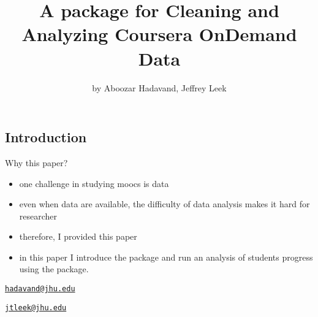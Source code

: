 \title{A package for Cleaning and Analyzing Coursera OnDemand Data}
\author{by Aboozar Hadavand, Jeffrey Leek}

\maketitle


\subsection{Introduction}\label{introduction}

Why this paper?

\begin{itemize}
    \item one challenge in studying moocs is data
    \item even when data are available, the difficulty of data analysis makes it hard for researcher
    \item therefore, I provided this paper
    \item in this paper I introduce the package and run an analysis of students progress using the package.
\end{itemize}

\address{%
Aboozar Hadavand\\
Bloomberg School of Public Health, Johns Hopkins University\\
615 N. Wolfe Street\\ Baltimore, MD 21205, USA\\
}
\href{mailto:hadavand@jhu.edu}{\nolinkurl{hadavand@jhu.edu}}

\address{%
Jeffrey Leek\\
Bloomberg School of Public Health, Johns Hopkins University\\
615 N. Wolfe Street\\ Baltimore, MD 21205, USA\\
}
\href{mailto:jtleek@jhu.edu}{\nolinkurl{jtleek@jhu.edu}}


